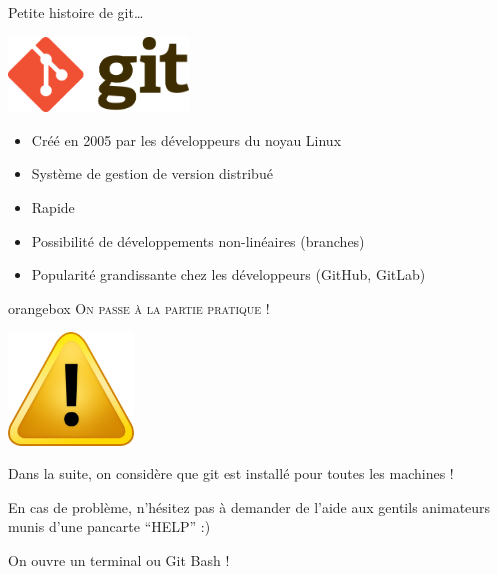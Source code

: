 \documentclass[usepdftitle=false]{beamer}
\begin{document}
\begin{frame}{Petite histoire de git\ldots}

\begin{center}
\includegraphics[height=2cm]{./imgs/logo_git.png}
\end{center}

\begin{itemize}
\item Créé en 2005 par les développeurs du noyau Linux
\item Système de gestion de version distribué
\item Rapide
\item Possibilité de développements non-linéaires (branches)
\item Popularité grandissante chez les développeurs (GitHub, GitLab)
\end{itemize}
\end{frame}

\begin{frame}
\begin{beamercolorbox}[sep=5pt,center,rounded=true,shadow=true]{orangebox}
\Large
\textsc{On passe à la partie pratique !}
\end{beamercolorbox}
\begin{center}
\includegraphics[height=3cm]{./imgs/warning.jpg}
\end{center}

\centering
Dans la suite, on considère que git est installé pour toutes les machines !

\medskip

\centering
En cas de problème, n'hésitez pas à demander de l'aide aux gentils animateurs munis d'une pancarte \enquote{HELP} :)

\begin{block}{}
\centering
On ouvre un terminal ou Git Bash !
\end{block}
\end{frame}
\end{document}
